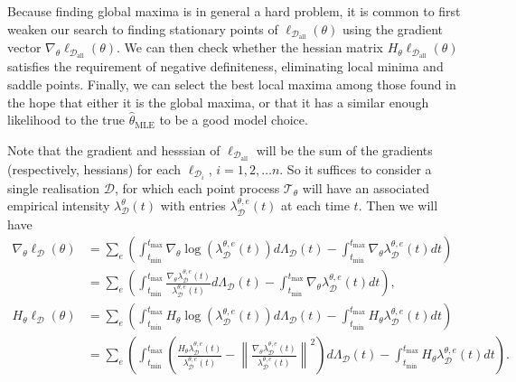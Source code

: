 \documentclass[honours,12pt]{unswthesis}
\numberwithin{equation}{section}
\begin{document}
Because finding global maxima is in general a hard problem, it is common to first weaken our search to finding stationary points of $\ell_{\mathcal{D}_\mathrm{all}}(\theta)$ using the gradient vector $\nabla_\theta \ell_{\mathcal{D}_\mathrm{all}}(\theta)$. We can then check whether the hessian matrix $H_\theta\ell_{\mathcal{D}_\mathrm{all}}(\theta)$ satisfies the requirement of negative definiteness, eliminating local minima and saddle points. Finally, we can select the best local maxima among those found in the hope that either it is the global maxima, or that it has a similar enough likelihood to the true $\hat\theta_\mathrm{MLE}$ to be a good model choice.

Note that the gradient and hesssian of $\ell_{\mathcal{D}_\mathrm{all}}$ will be the sum of the gradients (respectively, hessians) for each $\ell_{\mathcal{D}_i}$, $i=1,2,\ldots n$. So it suffices to consider a single realisation $\mathcal{D}$, for which each point process $\mathcal{T}_\theta$ will have an associated empirical intensity $\lambda_\mathcal{D}^\theta(t)$ with entries $\lambda_\mathcal{D}^{\theta,e}(t)$ at each time $t$. Then we will have
\begin{equation}
	\begin{align}
		\nabla_\theta \ell_\mathcal{D}(\theta) &= \sum_e\left(\int_{t_\mathrm{min}}^{t_\mathrm{max}}\nabla_\theta \log(\lambda_\mathcal{D}^{\theta,e}(t))d\Lambda_\mathcal{D}(t)-\int_{t_\mathrm{min}}^{t_\mathrm{max}}\nabla_\theta \lambda_\mathcal{D}^{\theta,e}(t) dt\right)\\
		&= \sum_e\left(\int_{t_\mathrm{min}}^{t_\mathrm{max}} \frac{\nabla_\theta \lambda_\mathcal{D}^{\theta,e}(t)}{\lambda_\mathcal{D}^{\theta,e}(t)} d\Lambda_\mathcal{D}(t)-\int_{t_\mathrm{min}}^{t_\mathrm{max}}\nabla_\theta \lambda_\mathcal{D}^{\theta,e}(t) dt\right),\\
		H_\theta \ell_\mathcal{D}(\theta) &= \sum_e\left(\int_{t_\mathrm{min}}^{t_\mathrm{max}} H_\theta \log(\lambda_\mathcal{D}^{\theta,e}(t))d\Lambda_\mathcal{D}(t) - \int_{t_\mathrm{min}}^{t_\mathrm{max}} H_\theta \lambda_\mathcal{D}^{\theta,e}(t) dt\right)\\ 
		&= \sum_e\left(\int_{t_\mathrm{min}}^{t_\mathrm{max}} \left( \frac{H_\theta \lambda_\mathcal{D}^{\theta,e}(t)}{\lambda_\mathcal{D}^{\theta,e}(t)} - \left\|\frac{\nabla_\theta\lambda_\mathcal{D}^{\theta,e}(t)}{\lambda_\mathcal{D}^{\theta,e}(t)}\right\|^2 \right) d\Lambda_\mathcal{D}(t) - \int_{t_\mathrm{min}}^{t_\mathrm{max}} H_\theta \lambda_\mathcal{D}^{\theta,e}(t) dt\right).\\ 
	\end{align}
\end{equation}
\end{document}
